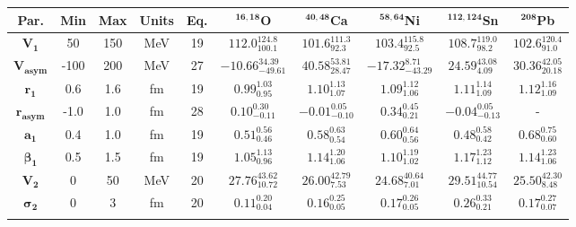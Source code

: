 \bgroup
\def\arraystretch{1.5}%
\begin{tabular}{ c c c c c c c c c c} 
\textbf{Par.} & \textbf{Min} & \textbf{Max} &                \textbf{Units} & \textbf{Eq.}& \textbf{$\mathbf{^{16,18}}$O}& \textbf{$\mathbf{^{40,48}}$Ca}& \textbf{$\mathbf{^{58,64}}$Ni}& \textbf{$\mathbf{^{112,124}}$Sn}& \textbf{$\mathbf{^{208}}$Pb}\\
 \hline 
$\mathbf{V_{1}}$ & 50 & 150 & MeV & 19 & $112.0^{124.8}_{100.1}$ & $101.6^{111.3}_{92.3}$ & $103.4^{115.8}_{92.5}$ & $108.7^{119.0}_{98.2}$ & $102.6^{120.4}_{91.0}$\\ 
$\mathbf{V_{asym}}$ & -100 & 200 & MeV & 27 & $-10.66^{34.39}_{-49.61}$ & $40.58^{53.81}_{28.47}$ & $-17.32^{8.71}_{-43.29}$ & $24.59^{43.08}_{4.09}$ & $30.36^{42.05}_{20.18}$\\ 
$\mathbf{r_{1}}$ & 0.6 & 1.6 & fm & 19 & $0.99^{1.03}_{0.95}$ & $1.10^{1.13}_{1.07}$ & $1.09^{1.12}_{1.06}$ & $1.11^{1.14}_{1.09}$ & $1.12^{1.16}_{1.09}$\\ 
$\mathbf{r_{asym}}$ & -1.0 & 1.0 & fm & 28 & $0.10^{0.30}_{-0.11}$ & $-0.01^{0.05}_{-0.10}$ & $0.34^{0.45}_{0.21}$ & $-0.04^{0.05}_{-0.13}$ & -\\ 
$\mathbf{a_{1}}$ & 0.4 & 1.0 & fm & 19 & $0.51^{0.56}_{0.46}$ & $0.58^{0.63}_{0.54}$ & $0.60^{0.64}_{0.56}$ & $0.48^{0.58}_{0.42}$ & $0.68^{0.75}_{0.60}$\\ 
$\mathbf{\beta_{1}}$ & 0.5 & 1.5 & fm & 19 & $1.05^{1.13}_{0.96}$ & $1.14^{1.20}_{1.06}$ & $1.10^{1.19}_{1.02}$ & $1.17^{1.23}_{1.12}$ & $1.14^{1.23}_{1.06}$\\ 
$\mathbf{V_{2}}$ & 0 & 50 & MeV & 20 & $27.76^{43.62}_{10.72}$ & $26.00^{42.79}_{7.53}$ & $24.68^{40.64}_{7.01}$ & $29.51^{44.77}_{10.54}$ & $25.50^{42.30}_{8.48}$\\ 
$\mathbf{\sigma_{2}}$ & 0 & 3 & fm & 20 & $0.11^{0.20}_{0.04}$ & $0.16^{0.25}_{0.05}$ & $0.17^{0.26}_{0.05}$ & $0.26^{0.33}_{0.21}$ & $0.17^{0.27}_{0.07}$\\ 
\\ 
\end{tabular}
\egroup
